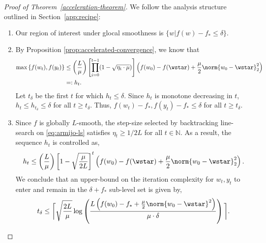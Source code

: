 \documentclass[10pt]{article} %
\newcommand{\yk}{y_t}
\newcommand{\wk}{w_t}
\newcommand{\etak}{\eta_{t}}
\newcommand{\fstar}{f_*}
\newcommand{\rbr}[1]{\left(#1\right)}
\newcommand{\sbr}[1]{\left[#1\right]}
\newcommand{\cbr}[1]{\left\{#1\right\}}
\begin{document}
\begin{proof}[Proof of Theorem~\ref{acceleration-theorem}]
    We follow the analysis structure outlined in Section~\ref{app:recipe}:
    \begin{enumerate}
        \item Our region of interest under glocal smoothness is $\{w | f(w) - f_* \leq \delta\}$.

        \item By Proposition \ref{prop:accelerated-convergence}, we know that
              \begin{align*}
                  \max\cbr{f(\wk), f(\yk)}
                   & \leq
                  \rbr{\frac{L}{\mu}} \sbr{\prod_{i=0}^{t-1} (1 - \sqrt{\eta_i \cdot \mu})} \rbr{f(w_0) - f(\wstar)
                  + \frac{\mu}{2} \norm{w_0 - \wstar}_2^2} \\
                   & =: h_t.
              \end{align*}
              Let \( t_{\delta} \) be the first \( t \) for which
              \( h_t \leq \delta \).
              Since \( h_t \) is monotone decreasing in \( t \),
              \( h_t \leq h_{t_{\delta}} \leq \delta \) for all \( t \geq t_{\delta} \).
              Thus, \( f(\wk) - \fstar, f(\yk) - \fstar \leq \delta \) for all \( t \geq t_\delta \).

        \item
              Since \( f \) is globally \( L \)-smooth, the step-size selected
              by backtracking line-search on \cref{eq:armijo-ls} satisfies \( \etak \geq
              1/2L \) for all \( t \in \mathbb{N} \).
              As a result, the sequence \( h_t \) is controlled as,
              \[
                  h_t
                  \leq \rbr{\frac{L}{\mu}} \sbr{
                      1 - \sqrt{\frac{\mu}{2L}}}^{t} \rbr{f(w_0) - f(\wstar)
                      + \frac{\mu}{2} \norm{w_0 - \wstar}_2^2}.
              \]
              We conclude that an upper-bound on the iteration complexity for \( \wk, \yk \)
              to enter and remain in the \( \delta + \fstar \) sub-level set is given by,
              \[
                  t_{\delta} \leq \bigg\lceil\sqrt{\frac{2L}{\mu}}\log\rbr{\frac{L \rbr{f(w_0) - \fstar + \frac{\mu}{2}\norm{w_0 - \wstar}^2}}{\mu \cdot \delta}}\bigg\rceil.
              \]


\end{enumerate}
\end{proof}
\end{document}
